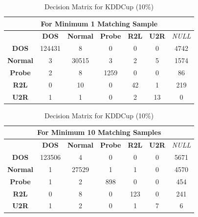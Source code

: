 \documentclass[pdflatex,sn-mathphys-num]{sn-jnl}%
\let\oldcaption\caption
\renewcommand{\caption}[1]{\oldcaption{\centering #1}}
\theoremstyle{thmstyleone}%
\theoremstyle{thmstyletwo}%
\theoremstyle{thmstylethree}%
\begin{document}
\begin{table}[ht!]
  \centering
  \caption{Decision Matrix for KDDCup (10\%)}
  \label{tab:KDDcup_Matrix}

  \begin{tabular}{|c|c|c|c|c|c|c|}
    \hline
    \multicolumn{7}{|c|}{\textbf{For Minimum 1 Matching Sample}} \\ \hline
                    & \textbf{DOS} & \textbf{Normal} & \textbf{Probe} & \textbf{R2L} & \textbf{U2R} & \textit{NULL} \\ \hline
    \textbf{DOS}    & 124431       & 8               & 0              & 0            & 0            & 4742          \\ \hline
    \textbf{Normal} & 3            & 30515           & 3              & 2            & 5            & 1574          \\ \hline
    \textbf{Probe}  & 2            & 8               & 1259           & 0            & 0            & 86            \\ \hline
    \textbf{R2L}    & 0            & 10              & 0              & 42           & 1            & 219           \\ \hline
    \textbf{U2R}    & 1            & 1               & 0              & 2            & 13           & 0             \\ \hline
  \end{tabular}
  \vspace{0.5cm}

  \begin{tabular}{|c|c|c|c|c|c|c|}
    \hline
    \multicolumn{7}{|c|}{\textbf{For Minimum 10 Matching Samples}} \\ \hline
                    & \textbf{DOS} & \textbf{Normal} & \textbf{Probe} & \textbf{R2L} & \textbf{U2R} & \textit{NULL} \\ \hline
    \textbf{DOS}    & 123506       & 4               & 0              & 0            & 0            & 5671          \\ \hline
    \textbf{Normal} & 1            & 27529           & 1              & 1            & 0            & 4570          \\ \hline
    \textbf{Probe}  & 1            & 2               & 898            & 0            & 0            & 454           \\ \hline
    \textbf{R2L}    & 0            & 8               & 0              & 123          & 0            & 241           \\ \hline
    \textbf{U2R}    & 1            & 2               & 0              & 1            & 7            & 6             \\ \hline
  \end{tabular}
  \vspace{0.5cm}


\end{table}
\end{document}
